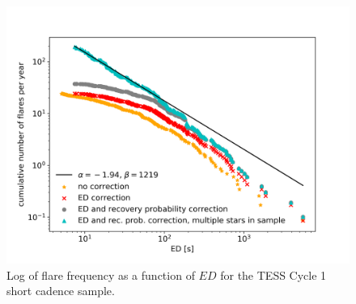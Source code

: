 \documentclass[twocolumn]{aastex62}
\begin{document}
\begin{figure}
	\includegraphics[width=\columnwidth]{12_03_2020_13_03_full_sample_ffd.png}
    \caption{Log of flare frequency as a function of $ED$ for the TESS Cycle 1 short cadence sample.}
    \label{fig:ffd_all_ed}
\end{figure}
\end{document}
